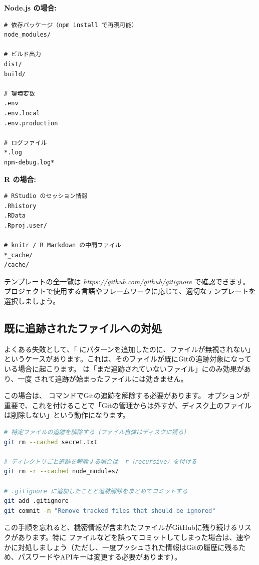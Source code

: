 \textbf{Node.js の場合:}

\begin{lstlisting}[language={}]
# 依存パッケージ（npm install で再現可能）
node_modules/

# ビルド出力
dist/
build/

# 環境変数
.env
.env.local
.env.production

# ログファイル
*.log
npm-debug.log*
\end{lstlisting}

\textbf{R の場合:}

\begin{lstlisting}[language={}]
# RStudio のセッション情報
.Rhistory
.RData
.Rproj.user/

# knitr / R Markdown の中間ファイル
*_cache/
/cache/
\end{lstlisting}

テンプレートの全一覧は \textit{https://github.com/github/gitignore} で確認できます。プロジェクトで使用する言語やフレームワークに応じて、適切なテンプレートを選択しましょう。

\subsection{既に追跡されたファイルへの対処}

よくある失敗として、「 にパターンを追加したのに、ファイルが無視されない」というケースがあります。これは、そのファイルが既にGitの追跡対象になっている場合に起こります。 は「まだ追跡されていないファイル」にのみ効果があり、一度  されて追跡が始まったファイルには効きません。

この場合は、 コマンドでGitの追跡を解除する必要があります。 オプションが重要で、これを付けることで「Gitの管理からは外すが、ディスク上のファイルは削除しない」という動作になります。

\begin{lstlisting}[language=bash]
# 特定ファイルの追跡を解除する（ファイル自体はディスクに残る）
git rm --cached secret.txt

# ディレクトリごと追跡を解除する場合は -r（recursive）を付ける
git rm -r --cached node_modules/

# .gitignore に追加したことと追跡解除をまとめてコミットする
git add .gitignore
git commit -m "Remove tracked files that should be ignored"
\end{lstlisting}

この手順を忘れると、機密情報が含まれたファイルがGitHubに残り続けるリスクがあります。特に  ファイルなどを誤ってコミットしてしまった場合は、速やかに対処しましょう（ただし、一度プッシュされた情報はGitの履歴に残るため、パスワードやAPIキーは変更する必要があります）。

